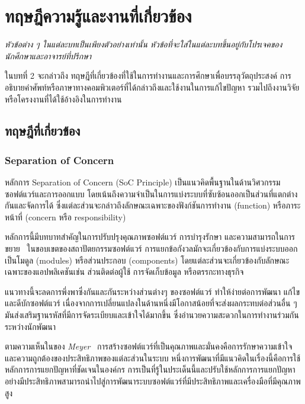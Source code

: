 \documentclass[12pt,oneside,openright,a4paper]{cpe-thai-project}
\begin{document}
\chapter{ทฤษฎีความรู้และงานที่เกี่ยวข้อง}

\emph{หัวข้อต่าง ๆ ในแต่ละบทเป็นเพียงตัวอย่างเท่านั้น หัวข้อที่จะใส่ในแต่ละบทขึ้นอยู่กับโปรเจคของนักศึกษาและอาจารย์ที่ปรึกษา}

ในบทที่ 2 จะกล่าวถึง ทฤษฎีที่เกี่ยวข้องที่ใช้ในการทำงานและการศึกษาเพื่อบรรลุวัตถุประสงค์ การอธิบายคำศัพท์หรือภาษาทางคอมพิวเตอร์ที่ได้กล่าวถึงและใช้งานในการแก้ไขปัญหา รวมไปถึงงานวิจัยหรือโครงงานที่ได้ใช้อ้างอิงในการทำงาน

\section{ทฤษฎีที่เกี่ยวข้อง}
    \subsection{Separation of Concern}

        \begin{flushleft}
        หลักการ Separation of Concern (SoC Principle) เป็นแนวคิดพื้นฐานในด้านวิศวกรรมซอฟต์แวร์และการออกแบบ โดยเน้นถึงความจำเป็นในการแบ่งระบบที่ซับซ้อนออกเป็นส่วนที่แตกต่างกันและจัดการได้ ซึ่งแต่ละส่วนจะกล่าวถึงลักษณะเฉพาะของฟังก์ชันการทำงาน (function) หรือภาระหน้าที่ (concern หรือ responsibility)~\cite{nattawat20}
        \end{flushleft}
        \begin{flushleft}
        หลักการนี้มีบทบาทสำคัญในการปรับปรุงคุณภาพซอฟต์แวร์ การบำรุงรักษา และความสามารถในการขยาย~\cite{dijkstra82} ในขอบเขตของสถาปัตยกรรมซอฟต์แวร์ การแยกข้อกังวลมักจะเกี่ยวข้องกับการแบ่งระบบออกเป็นโมดูล (modules) หรือส่วนประกอบ (components) โดยแต่ละส่วนจะเกี่ยวข้องกับลักษณะเฉพาะของแอปพลิเคชันเช่น ส่วนติดต่อผู้ใช้ การจัดเก็บข้อมูล หรือตรรกะทางธุรกิจ
        \end{flushleft}
        แนวทางนี้จะลดการพึ่งพาซึ่งกันและกันระหว่างส่วนต่างๆ ของซอฟต์แวร์ ทำให้ง่ายต่อการพัฒนา แก้ไข และดีบักซอฟต์แวร์ เนื่องจากการเปลี่ยนแปลงในด้านหนึ่งมีโอกาสน้อยที่จะส่งผลกระทบต่อส่วนอื่น ๆ มันส่งเสริมฐานรหัสที่มีการจัดระเบียบและเข้าใจได้มากขึ้น ซึ่งอำนวยความสะดวกในการทำงานร่วมกันระหว่างนักพัฒนา
        \begin{flushleft}
        ตามความเห็นในของ \textit{Meyer}~\cite{meyer88} การสร้างซอฟต์แวร์ที่เป็นคุณภาพและมั่นคงคือการรักษาความเข้าใจและความถูกต้องของประสิทธิภาพของแต่ละส่วนในระบบ หนึ่งการพัฒนาที่มีแนวคิดในเรื่องนี้คือการใช้หลักการการแยกปัญหาที่ชัดเจนในองค์กร การเป็นที่รู้ในประเด็นนี้และปรับใช้หลักการการแยกปัญหาอย่างมีประสิทธิภาพสามารถนำไปสู่การพัฒนาระบบซอฟต์แวร์ที่มีประสิทธิภาพและเครื่องมือที่มีคุณภาพสูง
        \end{flushleft}
\end{document}
